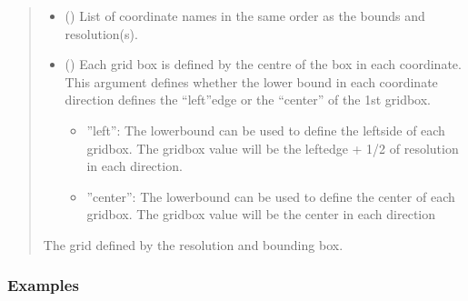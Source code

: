 \documentclass[letterpaper,10pt,english]{sphinxmanual}
\begin{document}
\begin{fulllineitems}
\begin{fulllineitems}
\begin{quote}
\begin{description}
\begin{itemize}
\item {}
\sphinxAtStartPar
{} (\sphinxstyleliteralemphasis{\sphinxupquote{{[}}}\sphinxstyleliteralemphasis{\sphinxupquote{{]}}}) \textendash{} List of coordinate names in the same order as the bounds and
resolution(s).

\item {}
\sphinxAtStartPar
{} (\sphinxstyleliteralemphasis{\sphinxupquote{ (}}\sphinxstyleliteralemphasis{\sphinxupquote{ | }}\sphinxstyleliteralemphasis{\sphinxupquote{)}}) \textendash{}
\sphinxAtStartPar
Each grid box is defined by the centre of the box in each
coordinate. This argument defines whether the lower bound in each
coordinate direction defines the “left”\sphinxhyphen{}edge or the “center” of the
1st grid\sphinxhyphen{}box.
\begin{itemize}
\item {}
\sphinxAtStartPar
”left”: The lower\sphinxhyphen{}bound can be used to define the left\sphinxhyphen{}side of
each grid\sphinxhyphen{}box. The grid\sphinxhyphen{}box value will be the left\sphinxhyphen{}edge + 1/2 of
resolution in each direction.

\item {}
\sphinxAtStartPar
”center”: The lower\sphinxhyphen{}bound can be used to define the center of each
grid\sphinxhyphen{}box. The grid\sphinxhyphen{}box value will be the center in each direction

\end{itemize}


\end{itemize}

\sphinxAtStartPar
{} \textendash{} The grid defined by the resolution and bounding box.

\sphinxAtStartPar
{\hyperref[\detokenize{grid:glomar_gridding.grid.Grid}]{}}

\end{description}\end{quote}
\subsubsection*{Examples}


\end{fulllineitems}
\end{fulllineitems}
\end{document}
